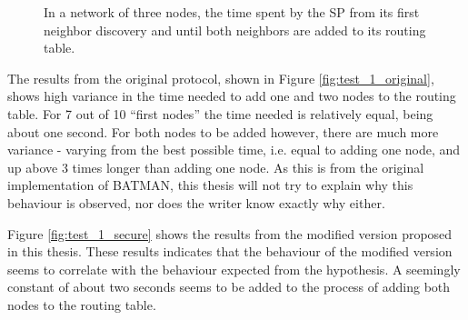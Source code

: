 \begin{figure}[h]
	\centering
	\caption{In a network of three nodes, the time spent by the \ac{SP} from its first neighbor discovery and until both neighbors are added to its routing table.}
	\label{fig:results_test_1}
\end{figure}

The results from the original protocol, shown in Figure
\ref{fig:test_1_original}, shows high variance in the time needed to add one and
two nodes to the routing table. For 7 out of 10 ``first nodes'' the time needed
is relatively equal, being about one second. For both nodes to be added however,
there are much more variance - varying from the best possible time, i.e. equal
to adding one node, and up above 3 times longer than adding one node. As this is
from the original implementation of BATMAN, this thesis will not try to explain
why this behaviour is observed, nor does the writer know exactly why either.

Figure \ref{fig:test_1_secure} shows the results from the modified version
proposed in this thesis. These results indicates that the behaviour of the
modified version seems to correlate with the behaviour expected from the
hypothesis. A seemingly constant of about two seconds seems to be added to the
process of adding both nodes to the routing table. 

